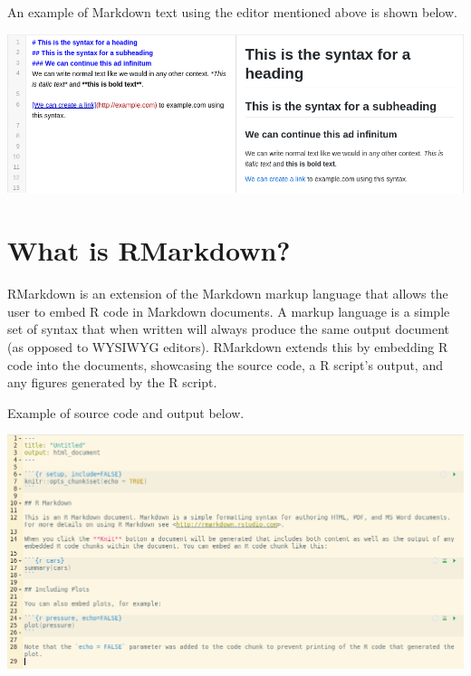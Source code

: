 \documentclass[
]{book}
\begin{document}
An example of Markdown text using the editor mentioned above is shown below.

\includegraphics{images/03-rmarkdown_3.png}

\hypertarget{what-is-rmarkdown}{%
\section{What is RMarkdown?}\label{what-is-rmarkdown}}

RMarkdown is an extension of the Markdown markup language that allows the user to embed R code in Markdown documents. A markup language is a simple set of syntax that when written will always produce the same output document (as opposed to WYSIWYG editors). RMarkdown extends this by embedding R code into the documents, showcasing the source code, a R script's output, and any figures generated by the R script.

Example of source code and output below.

\includegraphics{images/03-rmarkdown_1.png}
\end{document}
